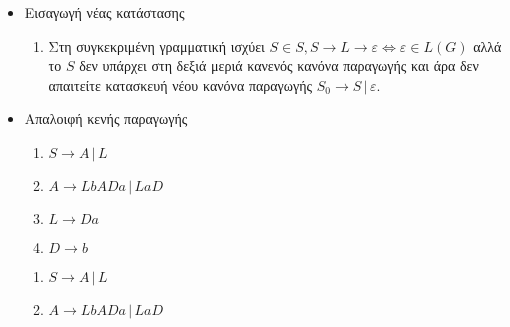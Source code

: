 
\begin{tcolorbox}[colback=yellow!15!white, colframe=blue!50!white,
	fonttitle=\bfseries\Large, title = Μετατροπή $CFG\rightarrow CNF$ 1/3]

\begin{itemize}
	\itemsep0em

	\item Εισαγωγή νέας κατάστασης
	\reducevspace\reducevspace\reducevspace\reducevspace\reducevspace\reducevspace\reducevspace
		\begin{enumerate}

			\item Στη συγκεκριμένη γραμματική ισχύει $S \in S, S\rightarrow L\rightarrow \varepsilon
			\Leftrightarrow \varepsilon \in L(G)$ αλλά το $S$ δεν υπάρχει στη δεξιά μεριά κανενός κανόνα παραγωγής
			και άρα δεν απαιτείτε κατασκευή νέου κανόνα παραγωγής $S_0\rightarrow S\,|\,\varepsilon$.

		\end{enumerate}

	\item Απαλοιφή κενής παραγωγής
	\reducevspace\reducevspace\reducevspace\reducevspace\reducevspace\reducevspace\reducevspace

		\begin{minipage}[t]{0.5\textwidth}
			\begin{enumerate}

				\item $S\rightarrow A \,|\, L$

				\item $A\rightarrow LbADa \,|\, LaD$

				\item $L\rightarrow Da$\textcolor{red}{\boldmath{$\,|\,\varepsilon$}}

				\item $D\rightarrow b$

			\end{enumerate}
		\end{minipage}%
		\hfill
		\begin{minipage}[t]{0.5\textwidth}
			\begin{enumerate}

				\item $S\rightarrow Α \,|\, L $\textcolor{blue}{\boldmath{$\,|\,\varepsilon$}}

				\item $A\rightarrow LbADa \,|\, LaD$\textcolor{blue}{}


\end{enumerate}
\end{minipage}
\end{itemize}
\end{tcolorbox}

